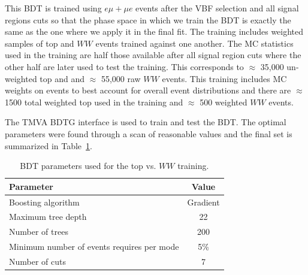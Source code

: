 This BDT is trained using $e\mu+\mu e$ events after the VBF selection and all signal regions cuts so that the phase space in which we train the BDT is exactly the same as the one where we apply it in the final fit. The training includes weighted samples of top and $WW$ events trained against one another. The MC statistics used in the training are half those available after all signal region cuts where the other half are later used to test the training. This corresponds to $\approx$ 35,000 un-weighted top and and $\approx$ 55,000 raw $WW$ events. This training includes MC weights on events to best account for overall event distributions and there are $\approx$ 1500 total weighted top used in the training and $\approx$ 500 weighted $WW$ events. 

The TMVA BDTG interface is used to train and test the BDT. The optimal parameters were found through a scan of reasonable values and the final set is summarized in Table~\ref{tab:WWBDTparameters}.
\begin{table}[h!]
\centering
\begin{tabular}{|l|c|}
\hline
Parameter                                    & Value     \\
\hline
Boosting algorithm                           &  Gradient  \\
Maximum tree depth                           &  22       \\
Number of trees                              &  200     \\
Minimum number of events requires per mode   &  5\%      \\
Number of cuts                               &  7        \\
\hline
\end{tabular}
\caption{BDT parameters used for the top vs. $WW$ training.} 
\label{tab:WWBDTparameters}
\end{table}

